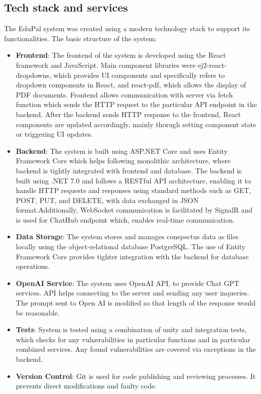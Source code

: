 \documentclass[
    english, %
]{VUMIFPSkursinis}
\begin{document}
\subsection{Tech stack and services}

The EduPal system was created using a modern technology stack to support its functionalities. The basic structure of the system:

\begin{itemize}
    \item \textbf{Frontend}: The frontend of the system is developed using the React framework and JavaScript. Main component libraries were ej2-react-dropdowns, which provides UI components and specifically refers to dropdown components in React, and react-pdf, which allows the display of PDF documents. Frontend allows communication with server via fetch function which sends the HTTP request to the particular API endpoint in the backend. After the backend sends HTTP response to the frontend, React components are updated accordingly, mainly thorugh setting component state or triggering UI updates.
    \item \textbf{Backend}: The system is built using ASP.NET Core and uses Entity Framework Core which helps following monolithic architecture, where backend is tightly integrated with frontend and database. The backend is built using .NET 7.0 and follows a RESTful API architecture, enabling it to handle HTTP requests and responses using standard methods such as GET, POST, PUT, and DELETE, with data exchanged in JSON format.Additionally, WebSocket communication is facilitated by SignalR and is used for ChatHub endpoint which, enables real-time communication.
    \item\textbf{Data Storage}: The system stores and manages conspectus data as files locally using the object-relational database PostgreSQL. The use of Entity Framework Core provides tighter integration with the backend for database operations.
    \item \textbf{OpenAI Service}: The system uses OpenAI API, to provide Chat GPT services. API helps connecting to the server and sending any user inqueries. The prompt sent to Open AI is modified so that length of the response would be reasonable.
    \item \textbf{Tests}: System is tested using a combination of unity and integration tests, which checks for any vulnerabilities in particular functions and in particular combined services. Any found vulnerabilities are covered via exceptions in the backend.
    \item \textbf{Version Control}: Git is used for code publishing and reviewing processes. It prevents direct modifications and faulty code.
\end{itemize}
\end{document}
